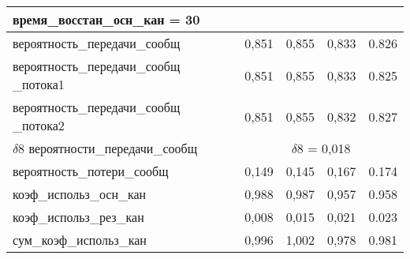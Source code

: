 \begin{longtable} {
	|p{}
	|p{}
	|p{}
	|p{}
	|p{}
	|}
{		время\_восстан\_осн\_кан = 30}  \\ \hline
	вероятность\_передачи\_сообщ & 0,851 & 0,855 & 0,833 & 0.826 \\ \hline
	вероятность\_передачи\_сообщ \_потока1 & 0,851 & 0,855
		& 0,833 & 0.825 \\ \hline
	вероятность\_передачи\_сообщ \_потока2 & 0,851 & 0,855
		& 0,832 & 0.827 \\ \hline
	$\delta$8 вероятности\_передачи\_сообщ &
		\multicolumn{4}{|c|}{$\delta$8 = 0,018} \\ \hline
	вероятность\_потери\_сообщ & 0,149 & 0,145 & 0,167 & 0.174 \\ \hline
	коэф\_использ\_осн\_кан & 0,988 & 0,987 & 0,957 & 0.958 \\ \hline
	коэф\_использ\_рез\_кан & 0,008 & 0,015 & 0,021 & 0.023 \\ \hline
	сум\_коэф\_использ\_кан & 0,996 & 1,002 & 0,978 & 0.981 \\ \hline

\end{longtable}

